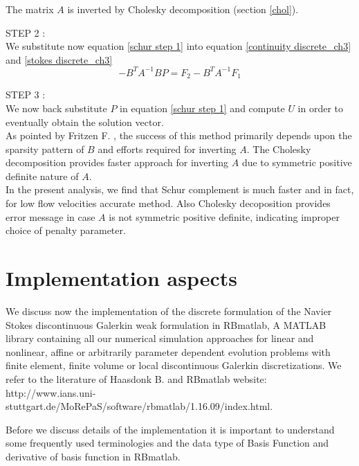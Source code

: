 \documentclass[a4paper]{book}
\begin{document}
The matrix $A$ is inverted by Cholesky decomposition (section \ref{chol}). 

STEP 2 : \\
We substitute now equation \eqref{schur step 1} into equation \eqref{continuity discrete_ch3} and \eqref{stokes discrete_ch3}
\begin{equation}\label{schur step 2}
- B^T A^{-1} B P = F_2 - B^T A^{-1} F_1
\end{equation}

STEP 3 : \\
We now back substitute $P$ in equation \eqref{schur step 1} and compute $U$ in order to eventually obtain the solution vector.
\\

As pointed by Fritzen F. \cite{Fritzen}, the success of this method primarily depends upon the sparsity pattern of $B$ and efforts required for inverting $A$. The Cholesky decomposition provides faster approach for inverting $A$ due to symmetric positive definite nature of $A$. \\

In the present analysis, we find that Schur complement is much faster and in fact, for low flow velocities accurate method. Also Cholesky decoposition provides error message in case $A$ is not symmetric positive definite, indicating improper choice of penalty parameter. 

\chapter{Implementation aspects} \label{implementation_aspects}

We discuss now the implementation of the discrete formulation of the Navier Stokes discontinuous Galerkin weak formulation in RBmatlab, A MATLAB library containing all our numerical simulation approaches for linear and nonlinear, affine or arbitrarily parameter dependent evolution problems with finite element, finite volume or local discontinuous Galerkin discretizations. We refer to the literature of Haasdonk B.\cite{Haasdonk_book} and RBmatlab website: \linebreak http://www.ians.uni-stuttgart.de/MoRePaS/software/rbmatlab/1.16.09/\linebreak index.html.  

Before we discuss details of the implementation it is important to understand some frequently used terminologies and the data type of Basis Function and derivative of basis function in RBmatlab.
\end{document}

